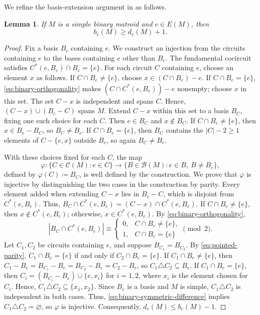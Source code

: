 \documentclass[11pt]{article}
\numberwithin{equation}{section}
\newtheorem{lemma}[lemma]{Lemma}
\newcommand{\BB}{\mathcal B}
\newcommand{\CC}{\mathcal C}
\begin{document}
We refine the basis-extension argument in
\cite[proof of Theorem~1.3]{Oxley1983} as follows.
\begin{lemma}\label{lem:pointed}
If \(M\) is a simple binary matroid and \(e\in E(M)\), then
\[
 b_e(M)\ge d_e(M)+1.
\]
\end{lemma}
\begin{proof}
Fix a basis \(B_e\) containing \(e\). We construct an injection
from the circuits containing \(e\) to the bases containing \(e\)
other than \(B_e\).
The fundamental cocircuit satisfies
\(C^*(e,B_e)\cap B_e=\{e\}\).
For each circuit \(C\) containing \(e\), choose an element \(x\)
as follows. If \(C\cap B_e\ne\{e\}\), choose
\(x\in(C\cap B_e)-e\). If \(C\cap B_e=\{e\}\),
\eqref{eq:binary-orthogonality} makes
\((C\cap C^*(e,B_e))-e\) nonempty;
choose \(x\) in this set.
The set \(C-x\) is independent and spans \(C\).
Hence, \((C-x)\cup(B_e-C)\) spans \(M\). Extend \(C-x\)
within this set to a basis \(B_C\), fixing one such choice for each
\(C\). Then \(e\in B_C\) and \(x\notin B_C\).
If \(C\cap B_e\ne\{e\}\), then \(x\in B_e-B_C\), so \(B_C\ne B_e\).
If \(C\cap B_e=\{e\}\), then \(B_C\) contains the
\(|C|-2\ge1\) elements of \(C-\{e,x\}\) outside \(B_e\),
so again \(B_C\ne B_e\).

With these choices fixed for each \(C\), the map
\[
 \varphi:\{C\in\CC(M):e\in C\}\to
 \{B\in\BB(M):e\in B,\ B\ne B_e\},
\]
defined by \(\varphi(C)\coloneqq B_C\), is well defined by the construction.
We prove that \(\varphi\) is injective by distinguishing the
two cases in the construction by parity. Every element added when extending
\(C-x\) lies in \(B_e-C\), which is disjoint from \(C^*(e,B_e)\).
Thus, \(B_C\cap C^*(e,B_e)=(C-x)\cap C^*(e,B_e)\).
If \(C\cap B_e\ne\{e\}\), then \(x\notin C^*(e,B_e)\);
otherwise, \(x\in C^*(e,B_e)\).
By \eqref{eq:binary-orthogonality},
\begin{equation}\label{eq:pointed-parity}
 |B_C\cap C^*(e,B_e)|\equiv
 \begin{cases}
 0,&C\cap B_e\ne\{e\},\\
 1,&C\cap B_e=\{e\}
 \end{cases}
 \pmod2.
\end{equation}
Let \(C_1,C_2\) be circuits containing \(e\), and suppose
\(B_{C_1}=B_{C_2}\). By \eqref{eq:pointed-parity},
\(C_1\cap B_e=\{e\}\) if and only if \(C_2\cap B_e=\{e\}\).
If \(C_1\cap B_e\ne\{e\}\), then
\(C_1-B_e=B_{C_1}-B_e=B_{C_2}-B_e=C_2-B_e\), so
\(C_1\triangle C_2\subseteq B_e\).
If \(C_1\cap B_e=\{e\}\), then
\(C_i=(B_{C_i}-B_e)\cup\{e,x_i\}\) for \(i=1,2\), where \(x_i\)
is the element chosen for \(C_i\). Hence,
\(C_1\triangle C_2\subseteq\{x_1,x_2\}\).
Since \(B_e\) is a basis and \(M\) is simple,
\(C_1\triangle C_2\) is independent in both cases.
Thus, \eqref{eq:binary-symmetric-difference} implies
\(C_1\triangle C_2=\varnothing\), so \(\varphi\) is injective.
Consequently, \(d_e(M)\le b_e(M)-1\).
\end{proof}
\end{document}
